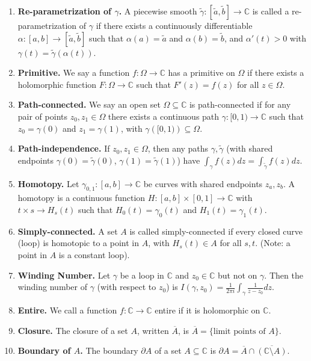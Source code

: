 \documentclass[12pt]{article}
\theoremstyle{definition}
\theoremstyle{named}
\begin{document}
{\begin{multicols}{2}
\begin{spacing}{1.01}
\begin{enumerate}
    \item \textbf{Re-parametrization of $\gamma$. } A piecewise smooth $\tilde{\gamma}: [\tilde{a}, \tilde{b}] \to \mathbb{C}$ is called a re-parametrization of $\gamma$ if there exists a continuously differentiable $\alpha: [a,b] \to [\tilde{a}, \tilde{b}]$ such that $\alpha(a) = \tilde{a}$ and $\alpha(b) = \tilde{b}$, and $\alpha'(t) > 0$ with $\gamma(t) = \tilde{\gamma}(\alpha(t))$. 
    \item \textbf{Primitive. } We say a function $f: \Omega \to \mathbb{C}$ has a primitive on $\Omega$ if there exists a holomorphic function $F: \Omega \to \mathbb{C}$ such that $F'(z) = f(z)$ for all $z \in \Omega$. 
    \item \textbf{Path-connected. } We say an open set $\Omega \subseteq \mathbb{C}$ is path-connected if for any pair of points $z_0, z_1 \in \Omega$ there exists a continuous path $\gamma: [0,1) \to \mathbb{C}$ such that $z_0 = \gamma(0)$ and $z_1 = \gamma(1)$, with $\gamma\left([0,1)\right) \subseteq \Omega$. 
    \item \textbf{Path-independence. } If $z_0,z_1 \in \Omega$, then any paths $\gamma, \tilde{\gamma}$ (with shared endpoints $\gamma(0) = \tilde{\gamma}(0)$, $\gamma(1) = \tilde{\gamma}(1)$) have $\int_{\gamma} f(z) dz = \int_{\tilde{\gamma}} f(z) dz$. 
    \item \textbf{Homotopy. } Let $\gamma_{0,1}: [a,b] \to \mathbb{C}$ be curves with shared endpoints $z_a, z_b$. A homotopy is a continuous function $H: [a,b] \times [0,1] \to \mathbb{C}$ with $t \times s \to H_s(t)$ such that $H_0(t) = \gamma_0(t)$ and $H_1(t) = \gamma_1(t)$. 
    \item \textbf{Simply-connected. } A set $A$ is called simply-connected if every closed curve (loop) is homotopic to a point in $A$, with $H_s(t) \in A$ for all $s,t$. (Note: a point in $A$ is a constant loop). 
    \item \textbf{Winding Number. } Let $\gamma$ be a loop in $\mathbb{C}$ and $z_0 \in \mathbb{C}$ but not on $\gamma$. Then the winding number of $\gamma$ (with respect to $z_0$) is $I(\gamma,z_0) = \frac{1}{2\pi i}\int_{\gamma} \frac{1}{z-z_0} dz$. 
    \item \textbf{Entire. } We call a function $f: \mathbb{C} \to \mathbb{C}$ entire if it is holomorphic on $\mathbb{C}$. 
    \item \textbf{Closure. } The closure of a set $A$, written $\overline{A}$, is $\overline{A} = \{\textrm{limit points of $A$}\}$. 
    \item \textbf{Boundary of $A$. } The boundary $\partial A$ of a set $A \subseteq \mathbb{C}$ is $\partial A = \overline{A} \cap \overline{\left(\mathbb{C} \setminus A\right)}$. 

\end{enumerate}
\end{spacing}
\end{multicols}}
\end{document}
